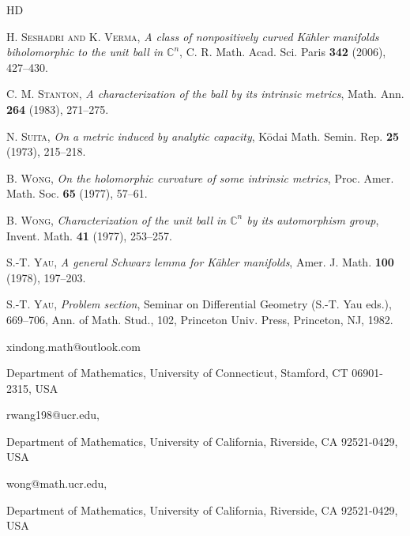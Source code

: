 \documentclass[12pt] {article}
\numberwithin{equation}{section}
\begin{document}
\begin{thebibliography}{HD}
{ \textsc{H. Seshadri and K. Verma}, \emph{A class of nonpositively curved K\"ahler manifolds biholomorphic to the unit ball in $\mathbb{C}^n$}, C. R. Math. Acad. Sci. Paris {\bf 342} (2006), 427--430.

 \textsc{C. M. Stanton}, \emph{A characterization of the ball by its intrinsic metrics}, Math. Ann. {\bf 264} (1983), 271--275.

 \textsc{N. Suita}, \emph{On a metric induced by analytic capacity}, K{\=o}dai Math. Semin. Rep. {\bf 25} (1973), 215--218.

 \textsc{B. Wong}, \emph{On the holomorphic curvature of some intrinsic metrics}, Proc. Amer. Math. Soc. {\bf 65} (1977), 57--61.

 \textsc{B. Wong}, \emph{Characterization of the unit ball in $\mathbb{C}^n$ by its automorphism group}, Invent. Math. {\bf 41} (1977), 253--257.

 \textsc{S.-T. Yau}, \emph{A general Schwarz lemma for K\"ahler manifolds}, Amer. J. Math. {\bf 100} (1978), 197--203.

 \textsc{S.-T. Yau}, \emph{Problem section}, Seminar on Differential Geometry (S.-T. Yau eds.), 669--706, Ann. of Math. Stud., 102, Princeton Univ. Press, Princeton, NJ, 1982.


   
}
\end{thebibliography}


\fontsize{11}{9}\selectfont

\vspace{0.5cm}

\noindent xindong.math@outlook.com

\vspace{0.2 cm}

\noindent Department of Mathematics, University of Connecticut, Stamford, CT 06901-2315, USA

\vspace{0.4cm}

\noindent rwang198@ucr.edu, 

\vspace{0.2 cm}

\noindent Department of Mathematics, University of California, Riverside, CA 92521-0429, USA

\vspace{0.4cm}

\noindent wong@math.ucr.edu,

\vspace{0.2 cm}

\noindent Department of Mathematics, University of California, Riverside, CA 92521-0429, USA
\end{document}
